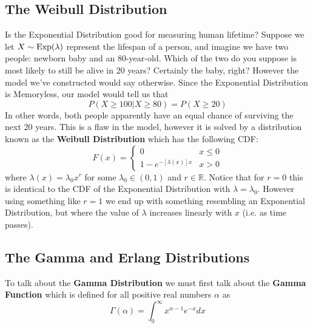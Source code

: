\documentclass{report}
\begin{document}
\subsection{The Weibull Distribution}
Is the Exponential Distribution good for measuring human lifetime? Suppose we let $X\sim \textup{Exp}(\lambda)$ represent the lifespan of a person, and imagine we have two people: newborn baby and an 80-year-old. Which of the two do you suppose is most likely to still be alive in 20 years? Certainly the baby, right? However the model we've constructed would say otherwise. Since the Exponential Distribution is Memoryless, our model would tell us that
\[
    P(X\ge 100 | X \ge 80) = P(X\ge 20)
\]
In other words, both people apparently have an equal chance of surviving the next 20 years. This is a flaw in the model, however it is solved by a distribution known as the \textbf{Weibull Distribution} which has the following CDF:
\[
    F(x) = 
    \begin{cases}
        0 & x \le 0
        \\
        1-e^{-[\lambda(x)]x} & x > 0
    \end{cases}
\]
where $\lambda(x)=\lambda_0 x^r$ for some $\lambda_0\in(0,1)$ and $r\in\mathbb R$. Notice that for $r=0$ this is identical to the CDF of the Exponential Distribution with $\lambda =\lambda_0$. However using something like $r=1$ we end up with something resembling an Exponential Distribution, but where the value of $\lambda$ increases linearly with $x$ (i.e. as time passes).  


\subsection{The Gamma and Erlang Distributions}
\newcommand{\gam}{\textup{Gam}}
To talk about the \textbf{Gamma Distribution} we must first talk about the \textbf{Gamma Function} which is defined for all positive real numbers $\alpha$ as
\[
    \Gamma(\alpha)=\int_0^\infty x^{\alpha - 1} e^{-x} dx
\]
\end{document}
